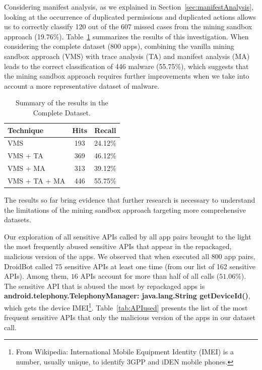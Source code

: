 Considering
manifest analysis, as we explained in Section~\ref{sec:manifestAnalysis},
looking at the occurrence of duplicated permissions and duplicated 
actions allows us to correctly classify \num{120} out of the \num{607} missed cases
from the mining sandbox approach (\num{19.76}\%).                                   
Table~\ref{tab:mfa-complete} summarizes the results of this investigation. When considering the 
complete dataset (\num{800} apps), combining the vanilla
mining sandbox approach (VMS) with trace analysis (TA) and
manifest analysis (MA) leads to the correct classification
of \num{446} malware (\num{55.75}\%), which suggests that
the mining sandbox approach requires further improvements when
we take into account a more representative dataset
of malware. 


\begin{table}[ht]
  \centering
  \begin{small}
  \begin{tabular}{lcc}\toprule
  Technique      & Hits & Recall \\ \midrule 
  VMS            & 193  & \num{24.12}\% \\ 
  VMS + TA       & 369  & \num{46.12}\%  \\
  VMS + MA       & 313  & \num{39.12}\% \\
  VMS + TA + MA  & 446  & \num{55.75}\% \\  \bottomrule
  \end{tabular}
  \end{small}
    \caption{Summary of the results in the Complete Dataset.}

 \label{tab:mfa-complete}
\end{table}

\begin{obs}{5}{}
  The results so far bring evidence that
  further research is necessary to understand
  the limitations of the mining sandbox approach
  targeting more comprehensive datasets.
\end{obs}

Our exploration of all sensitive APIs called by all app pairs brought to the light the most frequently abused sensitive APIs that
appear in the repackaged, malicious version of the apps. We observed that when executed all 800 app pairs, DroidBot called $75$ sensitive APIs at least one time (from our list of 162 sensitive APIs). Among them, $16$ APIs account for more than half of all calls ($51.06$\%).
The sensitive API that is abused the most by repackaged apps is \textbf{android.telephony.TelephonyManager: java.lang.String getDeviceId()}, which gets the device
IMEI\footnote{From Wikipedia: International Mobile Equipment Identity (IMEI) is a number, usually unique, to identify 3GPP and iDEN mobile phones.}.
Table~\ref{tab:APIused} presents the list of the most frequent sensitive APIs that only the malicious
version of the apps in our dataset call.

